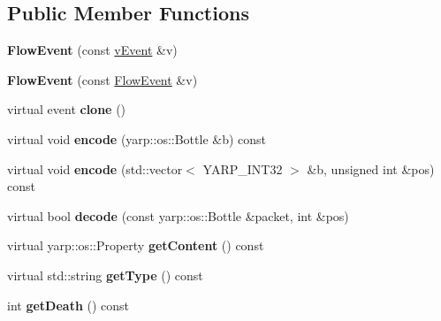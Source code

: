 \subsection*{Public Member Functions}
\begin{DoxyCompactItemize}
\item 
{\bfseries Flow\+Event} (const \hyperlink{classev_1_1vEvent}{v\+Event} \&v)\hypertarget{classev_1_1FlowEvent_aa268bbbeb75a7ec0634e7eff9bf9dda5}{}\label{classev_1_1FlowEvent_aa268bbbeb75a7ec0634e7eff9bf9dda5}

\item 
{\bfseries Flow\+Event} (const \hyperlink{classev_1_1FlowEvent}{Flow\+Event} \&v)\hypertarget{classev_1_1FlowEvent_a0784e0ce0b0b1fb1d9c61f8134efa70b}{}\label{classev_1_1FlowEvent_a0784e0ce0b0b1fb1d9c61f8134efa70b}

\item 
virtual event {\bfseries clone} ()\hypertarget{classev_1_1FlowEvent_a6a108ba6028ea69a9398745074d7300f}{}\label{classev_1_1FlowEvent_a6a108ba6028ea69a9398745074d7300f}

\item 
virtual void {\bfseries encode} (yarp\+::os\+::\+Bottle \&b) const \hypertarget{classev_1_1FlowEvent_a13c900d7027a67d8197e32d56e92e0b0}{}\label{classev_1_1FlowEvent_a13c900d7027a67d8197e32d56e92e0b0}

\item 
virtual void {\bfseries encode} (std\+::vector$<$ Y\+A\+R\+P\+\_\+\+I\+N\+T32 $>$ \&b, unsigned int \&pos) const \hypertarget{classev_1_1FlowEvent_ac73682ef30eaff91e10f399e74398de3}{}\label{classev_1_1FlowEvent_ac73682ef30eaff91e10f399e74398de3}

\item 
virtual bool {\bfseries decode} (const yarp\+::os\+::\+Bottle \&packet, int \&pos)\hypertarget{classev_1_1FlowEvent_a47a44a03752d3d0b5de668bfa8092d43}{}\label{classev_1_1FlowEvent_a47a44a03752d3d0b5de668bfa8092d43}

\item 
virtual yarp\+::os\+::\+Property {\bfseries get\+Content} () const \hypertarget{classev_1_1FlowEvent_a299486f89e1f893a513d237fd70ba00c}{}\label{classev_1_1FlowEvent_a299486f89e1f893a513d237fd70ba00c}

\item 
virtual std\+::string {\bfseries get\+Type} () const \hypertarget{classev_1_1FlowEvent_a181159b6f05391e438b4a68908e572fb}{}\label{classev_1_1FlowEvent_a181159b6f05391e438b4a68908e572fb}

\item 
int {\bfseries get\+Death} () const \hypertarget{classev_1_1FlowEvent_ac39faf9016620faaddccd6c15b9f513f}{}\label{classev_1_1FlowEvent_ac39faf9016620faaddccd6c15b9f513f}

\end{DoxyCompactItemize}
